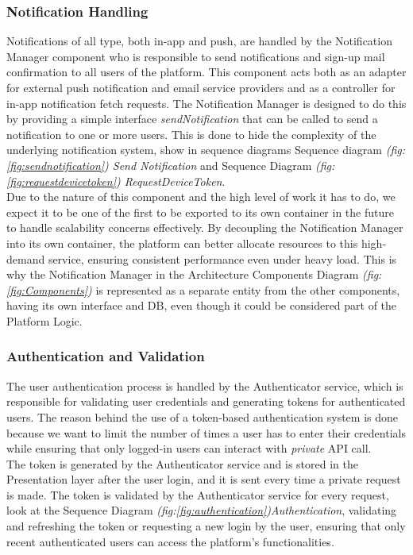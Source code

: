 \subsubsection*{Notification Handling}
    Notifications of all type, both in-app and push, are handled by the Notification Manager component who is responsible to send notifications and sign-up mail confirmation to all users of the platform. This component acts both as an adapter for external push notification and email service providers and as a controller for in-app notification fetch requests. The Notification Manager is designed to do this by providing a simple interface \textit{sendNotification} that can be called to send a notification to one or more users. This is done to hide the complexity of the underlying notification system, show in sequence diagrams Sequence diagram \textit{(fig:\ref{fig:sendnotification}) Send Notification} and Sequence Diagram \textit{(fig:\ref{fig:requestdevicetoken}) RequestDeviceToken}.\\ 
    Due to the nature of this component and the high level of work it has to do, we expect it to be one of the first to be exported to its own container in the future to handle scalability concerns effectively. By decoupling the Notification Manager into its own container, the platform can better allocate resources to this high-demand service, ensuring consistent performance even under heavy load. This is why the Notification Manager in the Architecture Components Diagram \textit{(fig:\ref{fig:Components})} is represented as a separate entity from the other components, having its own interface and DB, even though it could be considered part of the Platform Logic.
\subsubsection*{Authentication and Validation}
    The user authentication process is handled by the Authenticator service, which is responsible for validating user credentials and generating tokens for authenticated users. The reason behind the use of a token-based authentication system is done because we want to limit the number of times a user has to enter their credentials while ensuring that only logged-in users can interact with \textit{private} API call. \\
    The token is generated by the Authenticator service and is stored in the Presentation layer after the user login, and it is sent every time a private request is made. The token is validated by the Authenticator service for every request, look at the Sequence Diagram \textit{(fig:\ref{fig:authentication})Authentication}, validating and refreshing the token or requesting a new login by the user, ensuring that only recent authenticated users can access the platform's functionalities. 
